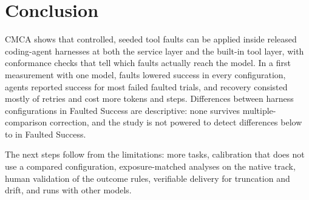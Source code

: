 \section{Conclusion}
\label{sec:conclusion}

CMCA shows that controlled, seeded tool faults can be applied inside released coding-agent harnesses at both the service layer and the built-in tool layer, with conformance checks that tell which faults actually reach the model.
In a first measurement with one model, faults lowered success in every configuration, agents reported success for most failed faulted trials, and recovery consisted mostly of retries and cost more tokens and steps.
Differences between harness configurations in Faulted Success are descriptive: none survives multiple-comparison correction, and the study is not powered to detect differences below \cmcaTrackNFixedMddMin{} to \cmcaTrackSMddMax{} in Faulted Success.

The next steps follow from the limitations: more tasks, calibration that does not use a compared configuration, exposure-matched analyses on the native track, human validation of the outcome rules, verifiable delivery for truncation and drift, and runs with other models.
